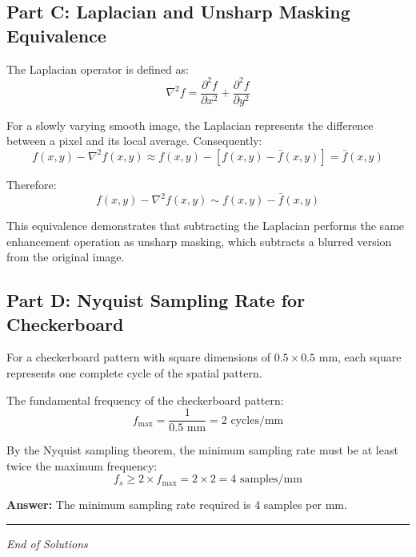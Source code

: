\documentclass[12pt,a4paper]{article}
\begin{document}
\subsection*{Part C: Laplacian and Unsharp Masking Equivalence}

The Laplacian operator is defined as:
\begin{equation*}
\nabla^2 f = \frac{\partial^2 f}{\partial x^2} + \frac{\partial^2 f}{\partial y^2}
\end{equation*}

For a slowly varying smooth image, the Laplacian represents the difference between a pixel and its local average. Consequently:
\begin{equation*}
f(x, y) - \nabla^2 f(x, y) \approx f(x, y) - [f(x, y) - \bar{f}(x, y)] = \bar{f}(x, y)
\end{equation*}

Therefore:
\begin{equation*}
f(x, y) - \nabla^2 f(x, y) \sim f(x, y) - \bar{f}(x, y)
\end{equation*}

This equivalence demonstrates that subtracting the Laplacian performs the same enhancement operation as unsharp masking, which subtracts a blurred version from the original image.

\subsection*{Part D: Nyquist Sampling Rate for Checkerboard}

For a checkerboard pattern with square dimensions of $0.5 \times 0.5$ mm, each square represents one complete cycle of the spatial pattern.

The fundamental frequency of the checkerboard pattern:
\begin{equation*}
f_{\max} = \frac{1}{0.5 \text{ mm}} = 2 \text{ cycles/mm}
\end{equation*}

By the Nyquist sampling theorem, the minimum sampling rate must be at least twice the maximum frequency:
\begin{equation*}
f_s \ge 2 \times f_{\max} = 2 \times 2 = 4 \text{ samples/mm}
\end{equation*}

\textbf{Answer:} The minimum sampling rate required is 4 samples per mm.

\vspace{2.0cm}
\noindent\rule{\textwidth}{0.5pt}
\begin{center}
\textit{End of Solutions}
\end{center}
\end{document}
